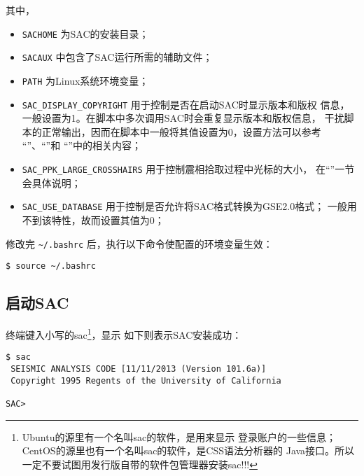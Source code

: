 其中，
\begin{itemize}
\item \texttt{SACHOME} 为SAC的安装目录；
\item \texttt{SACAUX} 中包含了SAC运行所需的辅助文件；
\item \texttt{PATH} 为Linux系统环境变量；
\item \verb|SAC_DISPLAY_COPYRIGHT| 用于控制是否在启动SAC时显示版本和版权
    信息，一般设置为1。在脚本中多次调用SAC时会重复显示版本和版权信息，
    干扰脚本的正常输出，因而在脚本中一般将其值设置为0，设置方法可以参考
    ``''、``''和
    ``''中的相关内容；
\item \verb|SAC_PPK_LARGE_CROSSHAIRS| 用于控制震相拾取过程中光标的大小，
    在``''一节会具体说明；
\item \verb|SAC_USE_DATABASE| 用于控制是否允许将SAC格式转换为GSE2.0格式；
    一般用不到该特性，故而设置其值为0；
\end{itemize}

修改完 \verb|~/.bashrc| 后，执行以下命令使配置的环境变量生效：
\begin{verbatim}
$ source ~/.bashrc
\end{verbatim}

\subsection*{启动SAC}
终端键入小写的sac\footnote{Ubuntu的源里有一个名叫sac的软件，是用来显示
登录账户的一些信息；CentOS的源里也有一个名叫sac的软件，是CSS语法分析器的
Java接口。所以一定不要试图用发行版自带的软件包管理器安装sac!!!}，显示
如下则表示SAC安装成功：
\begin{verbatim}
$ sac
 SEISMIC ANALYSIS CODE [11/11/2013 (Version 101.6a)]
 Copyright 1995 Regents of the University of California

SAC>
\end{verbatim}
